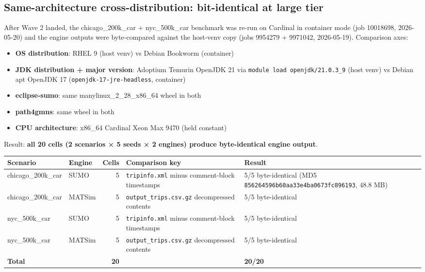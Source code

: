 \subsection{Same-architecture cross-distribution: bit-identical
at large
tier}\label{5631-same-architecture-cross-distribution-bit-identical-at-large-tier}

After Wave 2 landed, the chicago\_200k\_car + nyc\_500k\_car benchmark
was re-run on Cardinal in container mode (job 10018698, 2026-05-20) and
the engine outputs were byte-compared against the host-venv copy (jobs
9954279 + 9971042, 2026-05-19). Comparison axes:

\begin{itemize}
\tightlist
\item
  \textbf{OS distribution}: RHEL 9 (host venv) vs Debian Bookworm
  (container)
\item
  \textbf{JDK distribution + major version}: Adoptium Temurin OpenJDK 21
  via \texttt{module\ load\ openjdk/21.0.3\_9} (host venv) vs Debian apt
  OpenJDK 17 (\texttt{openjdk-17-jre-headless}, container)
\item
  \textbf{eclipse-sumo}: same manylinux\_2\_28\_x86\_64 wheel in both
\item
  \textbf{path4gmns}: same wheel in both
\item
  \textbf{CPU architecture}: x86\_64 Cardinal Xeon Max 9470 (held
  constant)
\end{itemize}

Result: \textbf{all 20 cells (2 scenarios × 5 seeds × 2 engines) produce
byte-identical engine output}.

\begin{longtable}[]{@{}llrll@{}}
\toprule\noalign{}
Scenario & Engine & Cells & Comparison key & Result \\
\midrule\noalign{}
\endhead
\bottomrule\noalign{}
\endlastfoot
chicago\_200k\_car & SUMO & 5 & \texttt{tripinfo.xml} minus
comment-block timestamps & 5/5 byte-identical (MD5
\texttt{856264596b60aa33e4ba0673fc896193}, 48.8 MB) \\
chicago\_200k\_car & MATSim & 5 & \texttt{output\_trips.csv.gz}
decompressed contents & 5/5 byte-identical \\
nyc\_500k\_car & SUMO & 5 & \texttt{tripinfo.xml} minus comment-block
timestamps & 5/5 byte-identical \\
nyc\_500k\_car & MATSim & 5 & \texttt{output\_trips.csv.gz} decompressed
contents & 5/5 byte-identical \\
\textbf{Total} & & \textbf{20} & & \textbf{20/20} \\
\end{longtable}

